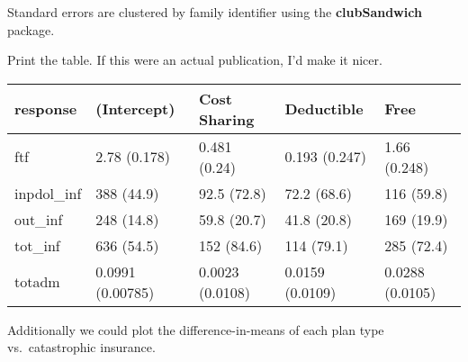 \documentclass[]{book}
\newenvironment{Shaded}{\begin{snugshade}}{\end{snugshade}}
\newcommand{\ControlFlowTok}[1]{\textcolor[rgb]{0.13,0.29,0.53}{\textbf{#1}}}
\newcommand{\DataTypeTok}[1]{\textcolor[rgb]{0.13,0.29,0.53}{#1}}
\newcommand{\DecValTok}[1]{\textcolor[rgb]{0.00,0.00,0.81}{#1}}
\newcommand{\KeywordTok}[1]{\textcolor[rgb]{0.13,0.29,0.53}{\textbf{#1}}}
\newcommand{\NormalTok}[1]{#1}
\newcommand{\OperatorTok}[1]{\textcolor[rgb]{0.81,0.36,0.00}{\textbf{#1}}}
\newcommand{\OtherTok}[1]{\textcolor[rgb]{0.56,0.35,0.01}{#1}}
\newcommand{\StringTok}[1]{\textcolor[rgb]{0.31,0.60,0.02}{#1}}
\theoremstyle{definition}
\theoremstyle{definition}
\theoremstyle{definition}
\theoremstyle{remark}
\begin{document}
Standard errors are clustered by family identifier using the
\textbf{clubSandwich} package.

Print the table. If this were an actual publication, I'd make it nicer.

\begin{Shaded}
\end{Shaded}

\begin{tabular}{l|l|l|l|l}
\hline
response & (Intercept) & Cost Sharing & Deductible & Free\\
\hline
ftf & 2.78 (0.178) & 0.481 (0.24) & 0.193 (0.247) & 1.66 (0.248)\\
\hline
inpdol\_inf & 388 (44.9) & 92.5 (72.8) & 72.2 (68.6) & 116 (59.8)\\
\hline
out\_inf & 248 (14.8) & 59.8 (20.7) & 41.8 (20.8) & 169 (19.9)\\
\hline
tot\_inf & 636 (54.5) & 152 (84.6) & 114 (79.1) & 285 (72.4)\\
\hline
totadm & 0.0991 (0.00785) & 0.0023 (0.0108) & 0.0159 (0.0109) & 0.0288 (0.0105)\\
\hline
\end{tabular}

Additionally we could plot the difference-in-means of each plan type
vs.~catastrophic insurance.
\end{document}

